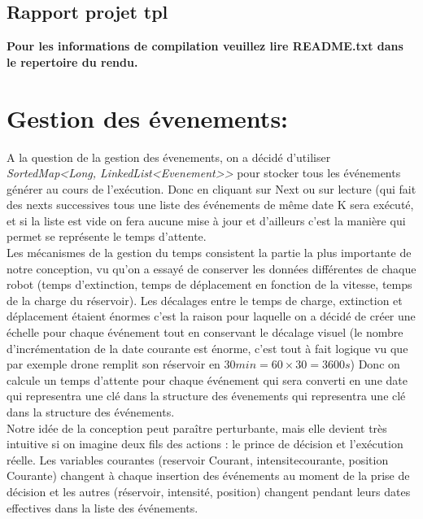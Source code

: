 \documentclass[french, 11pt]{article}
\begin{document}
		
	\setcounter{page}{1}
	\begin{center}
		\section*{Rapport projet tpl}
	\end{center}
	

 \textbf{Pour les informations de compilation veuillez lire README.txt dans le repertoire du rendu. }

\section*{Gestion des évenements:}
	A la question de la gestion des évenements, on a décidé d'utiliser \textit{SortedMap\textless{}Long, LinkedList\textless{}Evenement\textgreater{}\textgreater{}} pour stocker tous les événements générer au cours de l'exécution. Donc en cliquant sur Next ou sur lecture (qui fait des nexts successives tous une liste des événements de même date K sera exécuté, et si la liste est vide on fera aucune mise à jour et d'ailleurs c'est la manière qui permet se représente le temps d'attente. \\

	Les mécanismes de la gestion du temps consistent la partie la plus importante de notre conception, vu qu'on a essayé de conserver les données différentes de chaque robot (temps d'extinction, temps de déplacement en fonction de la vitesse, temps de la charge du réservoir). Les décalages entre le temps de charge, extinction et déplacement étaient énormes c'est la raison pour laquelle on a décidé de créer une échelle pour chaque événement tout en conservant le décalage visuel (le nombre d'incrémentation de la date courante est énorme, c'est tout à fait logique vu que par exemple drone remplit son réservoir en $30 min = 60\times{30} = 3600s$) Donc on calcule un temps d'attente pour chaque événement qui sera converti en une date qui representra une clé dans la structure des évenements qui representra une clé dans la structure des événements.\\


	Notre idée de la conception peut paraître perturbante, mais elle devient très intuitive si on imagine deux fils des actions : le prince de décision et l'exécution réelle. Les variables courantes (reservoir Courant, intensitecourante, position Courante) changent à chaque insertion des événements au moment de la prise de décision et les autres (réservoir, intensité, position) changent pendant leurs dates effectives dans la liste des événements.\\
\end{document}

